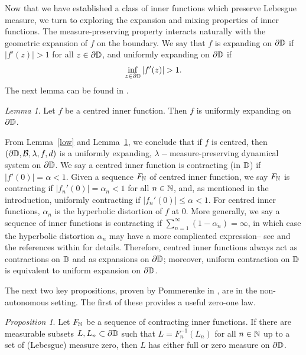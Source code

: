 \documentclass[11pt,reqno]{amsart}
\newcommand{\N}{{\Bbb N}}
\newcommand{\D}{{\Bbb D}}
\newcommand{\0}{\mathbf{0}}
\newtheorem{proposition}{Proposition}
\newtheorem{lemma}{Lemma}
\theoremstyle{remark}
\numberwithin{equation}{section}
\newtheorem{lemma}[theorem]{Lemma}
\newtheorem{proposition}[theorem]{Proposition}
\theoremstyle{remark}
\numberwithin{equation}{section}
\begin{document}
Now that we have established a class of inner functions which preserve Lebesgue measure, we turn to exploring the expansion and mixing properties of inner functions. The measure-preserving property interacts naturally with the geometric expansion of $f$ on the boundary. We say that $f$ is expanding on $\partial\D$ if $|f'(z)|>1$ for all $z \in \partial\D$, and uniformly expanding on $\partial\D$ if  
$$
\inf_{z \in \partial\D} |f'(z)| > 1.
$$
The next lemma can be found in \cite[Corollary~4.16]{deriv}.
\begin{lemma}\label{inexp}
Let $f$ be a centred inner function. Then $f$ is uniformly expanding on $\partial \D$.
\end{lemma}
From Lemma~\ref{low} and Lemma~\ref{inexp}, we conclude that if $f$ is centred, then 
$
(\partial\D, \mathcal{B}, \lambda, f, d)
$
is a uniformly expanding, $\lambda-$measure-preserving dynamical system on $\partial \D$.
We say a centred inner function is contracting (in $\D$) if  $|f'(0)|=\alpha<1$.   Given a sequence $F_\N$ of centred inner function, we say $F_\N$ is contracting if $|f_n'(0)|=\alpha_n<1$ for all $n \in \N$, and, as mentioned in the introduction, uniformly contracting if $|f_n'(0)| \leq \alpha < 1$. For centred inner functions, $\alpha_n$ is the hyperbolic distortion of $f$ at $0$. More generally, we say a sequence of inner functions is contracting if $\sum_{n=1}^\infty (1-\alpha_n) = \infty $, in which case the hyperbolic distortion $\alpha_n$ may have a more complicated expression-- see \cite{BERFS} and the references within for details.
Therefore, centred inner functions always act as contractions on 
$\D$ and as expansions on $\partial \D$;  moreover, uniform contraction on 
$\D$ is equivalent to uniform expansion on $\partial \D$.



The next two key propositions, proven by Pommerenke in \cite{Pom81}, are in the non-autonomous setting. The first of these provides a useful zero-one law.
\begin{proposition} \label{contractpom}
    Let $F_\N$ be a sequence of contracting inner functions. 
If there are measurable subsets $L, L_n \subset \partial \D$ such that $L = F_n^{-1}(L_n)$ for all $n \in \N$ up to a set of (Lebesgue) measure zero, then $L$ has either full or zero measure on $\partial \D$.
\end{proposition}
 
\end{document}
